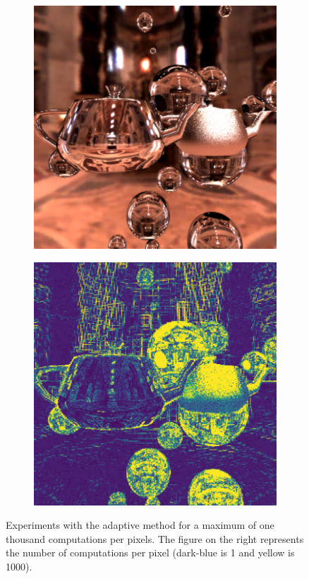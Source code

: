 \documentclass[acmsmall]{acmart}
\begin{document}
\begin{figure}[h]
    \centering
    
\begin{subfigure}{.5\textwidth}
  \centering
  \includegraphics[width=.9\linewidth]{img/denoised.png}
\end{subfigure}%
\begin{subfigure}{.5\textwidth}
  \centering
  \includegraphics[width=.9\linewidth]{img/compute.png}
\end{subfigure} 
    
    \caption{Experiments with the adaptive method for a maximum of one thousand computations per pixels. The figure on the right represents the number of computations per pixel (dark-blue is 1 and yellow is 1000).}
    \label{fig:adaptive}
\end{figure}
\end{document}
